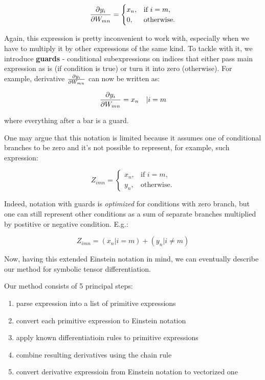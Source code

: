 \documentclass[conference]{IEEEtran}
\begin{document}
$$\pdv{y_i}{W_{mn}} = 
\begin{cases}
  x_n, & \text{if } i = m, \\
  0, & \text{otherwise}.
\end{cases}$$

Again, this expression is pretty inconvenient to work with, especially
when we have to multiply it by other expressions of the same kind. To
tackle with it, we introduce \textbf{guards} - conditional
subexpressions on indices that either pass main expression as is (if
condition is true) or turn it into zero (otherwise). For example,
derivative $\pdv{y_i}{W_{mn}}$ can now be written as:

$$\pdv{y_i}{W_{mn}} = x_n \quad | i = m$$

where everything after a bar is a guard.

One may argue that this notation is limited because it assumes one of
conditional branches to be zero and it's not possible to represent,
for example, such expression:

$$Z_{imn} = \begin{cases}
  x_n, & \text{if } i = m, \\
  y_n, & \text{otherwise}.
\end{cases}$$

Indeed, notation with guards is \textit{optimized} for conditions with
zero branch, but one can still represent other conditions as a sum of
separate branches multiplied by postitive or negative condition. E.g.:

$$Z_{imn} = (x_n | i = m) + (y_n | i \neq m)$$

Now, having this extended Einstein notation in mind, we can eventually
describe our method for symbolic tensor differentiation.

Our method consists of 5 principal steps:

\begin{enumerate}
\item parse expression into a list of primitive expressions
\item convert each primitive expression to Einstein notation
\item apply known differentiatioin rules to primitive expressions
\item combine resulting derivatives using the chain rule
\item convert derivative expressioin from Einstein notation to
  vectorized one
\end{enumerate}
\end{document}
